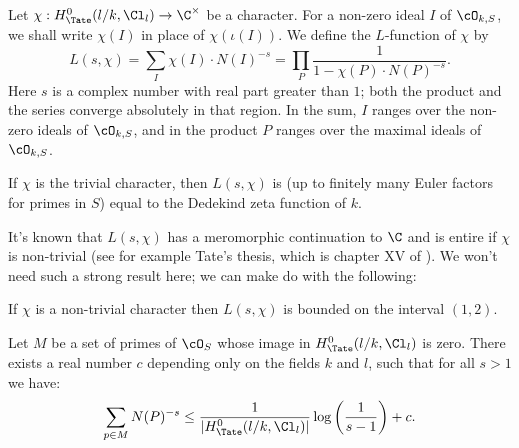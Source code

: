 \begin{definition} \label{def:L-function}
	Let $\chi : H^0_{\Tate}(l/k,\Cl_l) \to \C^\times$ be a character.
	For a non-zero ideal $I$ of $\cO_{k,S}$, we shall write $\chi(I)$ in place of $\chi(\iota(I))$.
	We define the $L$-function of $\chi$ by
	\[
		L(s,\chi)
		=
		\sum_{I} \chi(I) \cdot N(I)^{-s}
		=
		\prod_{P} \frac{1}{1-\chi(P) \cdot N(P)^{-s}}.
	\]
	Here $s$ is a complex number with real part greater than $1$; both the product and the series
	converge absolutely in that region.
	In the sum, $I$ ranges over the non-zero ideals of $\cO_{k,S}$, and in the product $P$
	ranges over the maximal ideals of $\cO_{k,S}$.

	If $\chi$ is the trivial character, then $L(s,\chi)$ is
	(up to finitely many Euler factors for primes in $S$)
	equal to the Dedekind zeta function of $k$.
\end{definition}


It's known that $L(s,\chi)$ has a meromorphic continuation to $\C$
and is entire if $\chi$ is non-trivial
(see for example Tate's thesis, which is chapter XV of \cite{cassells frohlich}).
We won't need such a strong result here; we can make do with the following:

\begin{lemma} \label{lem:L-function bound}
	If $\chi$ is a non-trivial character then $L(s,\chi)$ is
	bounded on the interval $(1,2)$.
\end{lemma}

\begin{lemma} \label{lem:density bound}
	Let $M$ be a set of primes of $\cO_S$ whose image in $H^0_{\Tate}(l/k,\Cl_l)$ is zero.
	There exists a real number $c$ depending only on the fields $k$ and $l$,
	such that for all $s > 1$ we have:
	\[
		\sum_{p \in M} N(P)^{-s}
		\le \frac{1}{|H^0_{\Tate}(l/k,\Cl_l)|} \log\left(\frac{1}{s-1}\right) + c.
	\]
\end{lemma}


